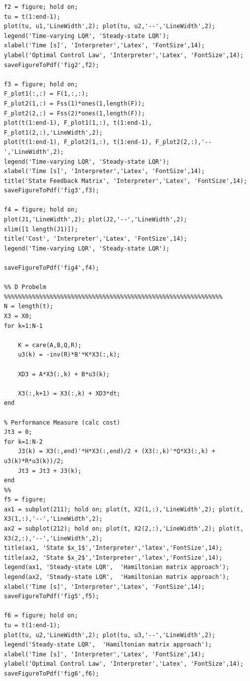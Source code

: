 \documentclass{article}
\begin{document}
\begin{lstlisting}
f2 = figure; hold on;
tu = t(1:end-1);
plot(tu, u1,'LineWidth',2); plot(tu, u2,'--','LineWidth',2);
legend('Time-varying LQR', 'Steady-state LQR');
xlabel('Time [s]', 'Interpreter','Latex', 'FontSize',14);
ylabel('Optimal Control Law', 'Interpreter','Latex', 'FontSize',14);
saveFigureToPdf('fig2',f2);

f3 = figure; hold on;
F_plot1(:,:) = F(1,:,:); 
F_plot2(1,:) = Fss(1)*ones(1,length(F));
F_plot2(2,:) = Fss(2)*ones(1,length(F));
plot(t(1:end-1), F_plot1(1,:), t(1:end-1), F_plot1(2,:),'LineWidth',2);
plot(t(1:end-1), F_plot2(1,:), t(1:end-1), F_plot2(2,:),'--','LineWidth',2);
legend('Time-varying LQR', 'Steady-state LQR');
xlabel('Time [s]', 'Interpreter','Latex', 'FontSize',14);
title('State Feedback Matrix', 'Interpreter','Latex', 'FontSize',14);
saveFigureToPdf('fig3',f3);

f4 = figure; hold on;
plot(J1,'LineWidth',2); plot(J2,'--','LineWidth',2);
xlim([1 length(J1)]);
title('Cost', 'Interpreter','Latex', 'FontSize',14);
legend('Time-varying LQR', 'Steady-state LQR');

saveFigureToPdf('fig4',f4);

%% D Probelm %%%%%%%%%%%%%%%%%%%%%%%%%%%%%%%%%%%%%%%%%%%%%%%%%%%%%%%%%%%%%%
N = length(t);
X3 = X0;
for k=1:N-1

    K = care(A,B,Q,R);
    u3(k) = -inv(R)*B'*K*X3(:,k);
    
    XD3 = A*X3(:,k) + B*u3(k);
    
    X3(:,k+1) = X3(:,k) + XD3*dt;    
end

% Performance Measure (calc cost)
Jt3 = 0;
for k=1:N-2
    J3(k) = X3(:,end)'*H*X3(:,end)/2 + (X3(:,k)'*Q*X3(:,k) + u3(k)*R*u3(k))/2;
    Jt3 = Jt3 + J3(k);
end
%%
f5 = figure;
ax1 = subplot(211); hold on; plot(t, X2(1,:),'LineWidth',2); plot(t, X3(1,:),'--','LineWidth',2);
ax2 = subplot(212); hold on; plot(t, X2(2,:),'LineWidth',2); plot(t, X3(2,:),'--','LineWidth',2);
title(ax1, 'State $x_1$','Interpreter','latex','FontSize',14); 
title(ax2, 'State $x_2$','Interpreter','latex','FontSize',14);   
legend(ax1, 'Steady-state LQR',  'Hamiltonian matrix approach');
legend(ax2, 'Steady-state LQR',  'Hamiltonian matrix approach');
xlabel('Time [s]', 'Interpreter','Latex', 'FontSize',14);
saveFigureToPdf('fig5',f5);
    
f6 = figure; hold on;
tu = t(1:end-1);
plot(tu, u2,'LineWidth',2); plot(tu, u3,'--','LineWidth',2);
legend('Steady-state LQR',  'Hamiltonian matrix approach');
xlabel('Time [s]', 'Interpreter','Latex', 'FontSize',14);
ylabel('Optimal Control Law', 'Interpreter','Latex', 'FontSize',14);
saveFigureToPdf('fig6',f6);


\end{lstlisting}
\end{document}
